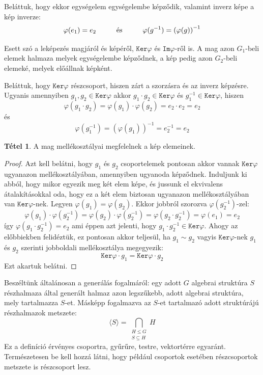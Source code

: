 \documentclass[12pt]{book}
\theoremstyle{plain} %
\theoremstyle{definition} %
\newtheorem{theo/}{Tétel}[section]
\newenvironment{theo}
  {\renewcommand{\qedsymbol}{$\clubsuit$}%
   \pushQED{\qed}\begin{theo/}}
  {\popQED\end{theo/}}
\theoremstyle{remark}
\renewcommand\qedsymbol{$\blacksquare$}
\numberwithin{equation}{section}  %
\begin{document}
	Beláttuk, hogy ekkor egységelem egységelembe képződik, valamint inverz képe a kép inverze:
	\[ \varphi(e_1) = e_2 \hspace{10mm} \text{és} \hspace{10mm} \varphi(g^{-1}) = \left(\varphi(g)\right)^{-1}  \]
	
	Esett szó a leképezés magjáról és képéről, $\mathtt{Ker}\varphi$ és $\mathtt{Im}\varphi$-ről is. A mag azon $G_1$-beli elemek halmaza melyek egységelembe képződnek, a kép pedig azon $G_2$-beli elemeké, melyek előállnak képként.
	
	Beláttuk, hogy $\mathtt{Ker}\varphi$ részcsoport, hiszen zárt a szorzásra és az inverz képzésre. Ugyanis amennyiben $g_1, g_2 \in \mathtt{Ker}\varphi$ akkor $g_1\cdot g_2\in \mathtt{Ker}\varphi$ és $g_1^{-1}\in \mathtt{Ker}\varphi$, hiszen
	\[ \varphi(g_1\cdot g_2) = \varphi(g_1)\cdot \varphi(g_2) = e_2 \cdot e_2 = e_2  \]
	és
	\[ \varphi\left(g_1^{-1}\right) = \left(\varphi (g_1)\right)^{-1} = e_2^{-1} = e_2  \]
	
	\begin{theo}\label{magmellkepbij}
		A mag mellékosztályai megfelelnek a kép elemeinek.
	\end{theo}
	
	\begin{proof}
		Azt kell belátni, hogy $g_1$ és $g_2$ csoportelemek pontosan akkor vannak $\mathtt{Ker}\varphi$ ugyanazon mellékosztályában, amennyiben ugyanoda képződnek. Induljunk ki abból, hogy mikor egyezik meg két elem képe, és jussunk el ekvivalens átalakításokkal oda, hogy ez a két elem biztosan ugyanazon mellékosztályában van $\mathtt{Ker}\varphi$-nek. Legyen $\varphi(g_1)=\varphi(g_2)$. Ekkor jobbról szorozva $\varphi\left(g_2^{-1}\right)$-zel:
		\[ \varphi(g_1)\cdot \varphi\left(g_2^{-1}\right) = \varphi(g_2)\cdot \varphi\left(g_2^{-1}\right) = \varphi\left(g_2\cdot g_2^{-1}\right) = \varphi(e_1) = e_2  \]
		így $\varphi\left(g_1\cdot g_2^{-1}\right)=e_2$ ami éppen azt jelenti, hogy $g_1\cdot g_2^{-1}\in \mathtt{Ker}\varphi$. Ahogy az előbbiekben felidéztük, ez pontosan akkor teljesül, ha $g_1\sim g_2$ vagyis $\mathtt{Ker}\varphi$-nek $g_1$ és $g_2$ szerinti jobboldali mellékosztálya megegyezik:
		\[ \mathtt{Ker}\varphi \cdot g_1 = \mathtt{Ker}\varphi \cdot g_2   \]
		Ezt akartuk belátni.
	\end{proof}
	
	Beszéltünk általánosan a generálás fogalmáról: egy adott $G$ algebrai struktúra $S$ részhalmaza által generált halmaz azon legszűkebb, adott algebrai struktúra, mely tartalmazza $S$-et. Másképp fogalmazva az $S$-et tartalmazó adott struktúrájú részhalmazok metszete:
	\[ \langle S \rangle = \bigcap\limits_{\substack{H\leq G \\ S\subseteq H}} H   \]
	Ez a definíció érvényes csoportra, gyűrűre, testre, vektortérre egyaránt. Természetesen be kell hozzá látni, hogy például csoportok esetében részcsoportok metszete is részcsoport lesz.
	
\end{document}
